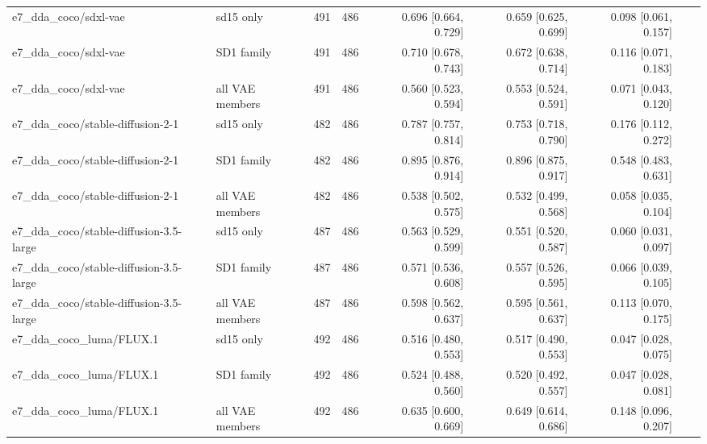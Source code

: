 \begin{table}[htbp]
\begin{tabular}{llrrrrrrr}
e7\_dda\_coco/sdxl-vae & sd15 only & 491 & 486 & 0.696 [0.664, 0.729] & 0.659 [0.625, 0.699] & 0.098 [0.061, 0.157] &  &  \\
e7\_dda\_coco/sdxl-vae & SD1 family & 491 & 486 & 0.710 [0.678, 0.743] & 0.672 [0.638, 0.714] & 0.116 [0.071, 0.183] &  &  \\
e7\_dda\_coco/sdxl-vae & all VAE members & 491 & 486 & 0.560 [0.523, 0.594] & 0.553 [0.524, 0.591] & 0.071 [0.043, 0.120] &  &  \\
e7\_dda\_coco/stable-diffusion-2-1 & sd15 only & 482 & 486 & 0.787 [0.757, 0.814] & 0.753 [0.718, 0.790] & 0.176 [0.112, 0.272] &  &  \\
e7\_dda\_coco/stable-diffusion-2-1 & SD1 family & 482 & 486 & 0.895 [0.876, 0.914] & 0.896 [0.875, 0.917] & 0.548 [0.483, 0.631] &  &  \\
e7\_dda\_coco/stable-diffusion-2-1 & all VAE members & 482 & 486 & 0.538 [0.502, 0.575] & 0.532 [0.499, 0.568] & 0.058 [0.035, 0.104] &  &  \\
e7\_dda\_coco/stable-diffusion-3.5-large & sd15 only & 487 & 486 & 0.563 [0.529, 0.599] & 0.551 [0.520, 0.587] & 0.060 [0.031, 0.097] &  &  \\
e7\_dda\_coco/stable-diffusion-3.5-large & SD1 family & 487 & 486 & 0.571 [0.536, 0.608] & 0.557 [0.526, 0.595] & 0.066 [0.039, 0.105] &  &  \\
e7\_dda\_coco/stable-diffusion-3.5-large & all VAE members & 487 & 486 & 0.598 [0.562, 0.637] & 0.595 [0.561, 0.637] & 0.113 [0.070, 0.175] &  &  \\
e7\_dda\_coco\_luma/FLUX.1 & sd15 only & 492 & 486 & 0.516 [0.480, 0.553] & 0.517 [0.490, 0.553] & 0.047 [0.028, 0.075] &  &  \\
e7\_dda\_coco\_luma/FLUX.1 & SD1 family & 492 & 486 & 0.524 [0.488, 0.560] & 0.520 [0.492, 0.557] & 0.047 [0.028, 0.081] &  &  \\
e7\_dda\_coco\_luma/FLUX.1 & all VAE members & 492 & 486 & 0.635 [0.600, 0.669] & 0.649 [0.614, 0.686] & 0.148 [0.096, 0.207] &  &  \\
\bottomrule
\end{tabular}
\end{table}
